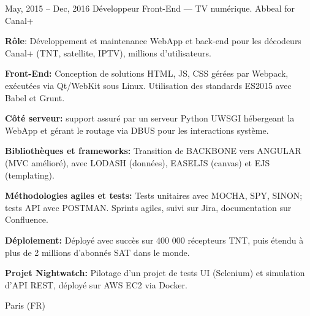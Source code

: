 \documentclass[
  a4paper,
   maincolor=cvblue,
   sectioncolor=cvblue,
   sidebarwidth=0.323\paperwidth,
]{fortysecondscv}
\begin{document}
\begin{cvtableNew}
  \cvitemRightNew
    {May, 2015 – Dec, 2016} %
    {Développeur Front-End — TV numérique.} %
    {Abbeal for Canal+} %
    {
      \vspace{-0.4pt} %
      \fontsize{10.8pt}{12pt}\selectfont %
      \textbf{Rôle}: Développement et maintenance WebApp et back-end pour les décodeurs Canal+ (TNT, satellite, IPTV), millions d’utilisateurs.\par
      \vspace{4pt}
      \textbf{Front-End:} Conception de solutions HTML, JS, CSS gérées par Webpack, exécutées via Qt/WebKit sous Linux. Utilisation des standards ES2015 avec Babel et Grunt.\par
      \vspace{4pt}
      \textbf{Côté serveur:} support assuré par un serveur Python UWSGI hébergeant la WebApp et gérant le routage via DBUS pour les interactions système.\par
      \vspace{4pt}
      \textbf{Bibliothèques et frameworks:} Transition de BACKBONE vers ANGULAR (MVC amélioré), avec LODASH (données), EASELJS (canvas) et EJS (templating).\par
      \vspace{4pt}
      \textbf{Méthodologies agiles et tests:} Tests unitaires avec MOCHA, SPY, SINON; tests API avec POSTMAN. Sprints agiles, suivi sur Jira, documentation sur Confluence.\par
      \vspace{4pt}
      \textbf{Déploiement:} Déployé avec succès sur 400 000 récepteurs TNT, puis étendu à plus de 2 millions d’abonnés SAT dans le monde.\par
      \vspace{4pt}
      \textbf{Projet Nightwatch:} Pilotage d’un projet de tests UI (Selenium) et simulation d’API REST, déployé sur AWS EC2 via Docker.\par
      \vspace{4pt} %
    }
    {Paris (FR)} %


    \vspace{1.18mm} %


\end{cvtableNew}
\end{document}
